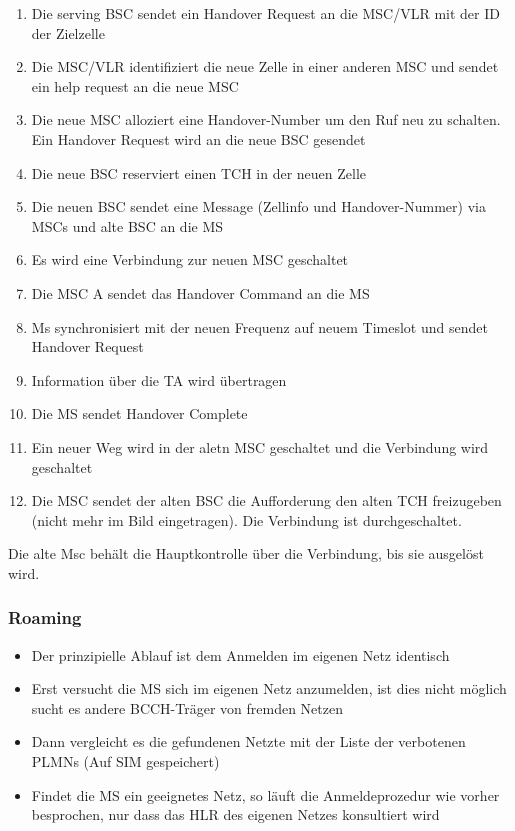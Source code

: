 \begin{enumerate}
\item Die serving BSC sendet ein Handover Request an die MSC/VLR mit der ID der Zielzelle
\item Die MSC/VLR identifiziert die neue Zelle in einer anderen MSC und sendet ein help request an die neue MSC
\item Die neue MSC alloziert eine Handover-Number um den Ruf neu zu schalten. Ein Handover Request wird an die neue BSC gesendet
\item Die neue BSC reserviert einen TCH in der neuen Zelle
\item Die neuen BSC sendet eine Message (Zellinfo und Handover-Nummer) via MSCs und alte BSC an die MS
\item Es wird eine Verbindung zur neuen MSC geschaltet
\item Die MSC A sendet das Handover Command an die MS
\item Ms synchronisiert mit der neuen Frequenz auf neuem Timeslot und sendet Handover Request 
\item Information über die TA wird übertragen
\item Die MS sendet Handover Complete
\item Ein neuer Weg wird in der aletn MSC geschaltet und die Verbindung wird geschaltet
\item Die MSC sendet der alten BSC die Aufforderung den alten TCH freizugeben (nicht mehr im Bild eingetragen). Die Verbindung ist durchgeschaltet. 
\end{enumerate}
Die alte Msc behält die Hauptkontrolle über die Verbindung, bis sie ausgelöst wird.

\subsubsection{Roaming}
\begin{itemize}
\item Der prinzipielle Ablauf ist dem Anmelden im eigenen Netz identisch
\item Erst versucht die MS sich im eigenen Netz anzumelden, ist dies nicht möglich sucht es andere BCCH-Träger von fremden Netzen
\item Dann vergleicht es die gefundenen Netzte mit der Liste der verbotenen PLMNs (Auf SIM gespeichert)
\item Findet die MS ein geeignetes Netz, so läuft die Anmeldeprozedur wie vorher besprochen, nur dass das HLR des eigenen Netzes konsultiert wird
\end{itemize}

